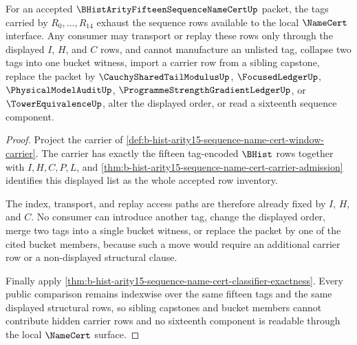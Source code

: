 \begin{theorem}
\label{thm:b-hist-arity15-sequence-name-cert-tag-exhaustion}
For an accepted $\BHistArityFifteenSequenceNameCertUp$ packet, the tags carried by $R_0,\ldots,R_{14}$ exhaust the sequence rows available to the local $\NameCert$ interface. Any consumer may transport or replay these rows only through the displayed $I$, $H$, and $C$ rows, and cannot manufacture an unlisted tag, collapse two tags into one bucket witness, import a carrier row from a sibling capstone, replace the packet by $\CauchySharedTailModulusUp$, $\FocusedLedgerUp$, $\PhysicalModelAuditUp$, $\ProgrammeStrengthGradientLedgerUp$, or $\TowerEquivalenceUp$, alter the displayed order, or read a sixteenth sequence component.
\end{theorem}
\begin{proof}
Project the carrier of \autoref{def:b-hist-arity15-sequence-name-cert-window-carrier}. The carrier has exactly the fifteen tag-encoded $\BHist$ rows together with $I,H,C,P,L$, and \autoref{thm:b-hist-arity15-sequence-name-cert-carrier-admission} identifies this displayed list as the whole accepted row inventory.

The index, transport, and replay access paths are therefore already fixed by $I$, $H$, and $C$. No consumer can introduce another tag, change the displayed order, merge two tags into a single bucket witness, or replace the packet by one of the cited bucket members, because such a move would require an additional carrier row or a non-displayed structural clause.

Finally apply \autoref{thm:b-hist-arity15-sequence-name-cert-classifier-exactness}. Every public comparison remains indexwise over the same fifteen tags and the same displayed structural rows, so sibling capstones and bucket members cannot contribute hidden carrier rows and no sixteenth component is readable through the local $\NameCert$ surface.
\end{proof}

